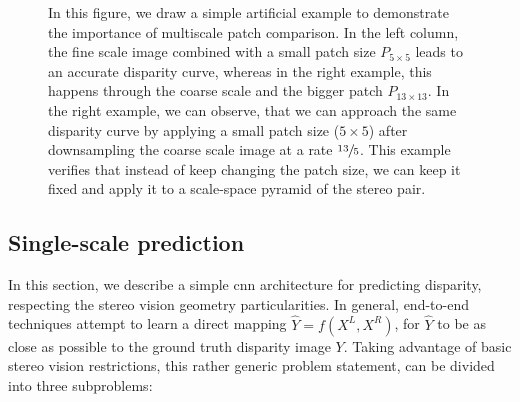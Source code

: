\documentclass[10pt]{article}
\begin{document}
\begin{figure}[t]
{\begin{subfigure}[t]{0.54\textwidth}
\end{subfigure}
}
\vspace{-15pt}
\caption{In this figure, we draw a simple artificial example to demonstrate the importance of multiscale patch comparison. In the left column, the fine scale image combined with a small patch size $P_{5 \times 5}$ leads to an accurate disparity curve, whereas in the right example, this happens through the coarse scale and the bigger patch $P_{13 \times 13}$. In the right example, we can observe, that we can approach the same disparity curve by applying a small patch size ($5 \times 5$) after downsampling the coarse scale image at a rate $\sfrac{13}{5}$. This example verifies that instead of keep changing the patch size, we can keep it fixed and apply it to a scale-space pyramid of the stereo pair.}
\label{fig:multiscale_importance_2D}  
\vspace{-3pt}      
\end{figure}

\subsection{Single-scale prediction}

In this section, we describe a simple cnn architecture for predicting disparity, respecting the stereo vision geometry particularities. In general, end-to-end techniques attempt to learn a direct mapping $\hat{Y} = f(X^L, X^R)$, for $\hat{Y}$ to be as close as possible to the ground truth disparity image $Y$. Taking advantage of basic stereo vision restrictions, this rather generic problem statement, can be divided into three subproblems:
\end{document}
